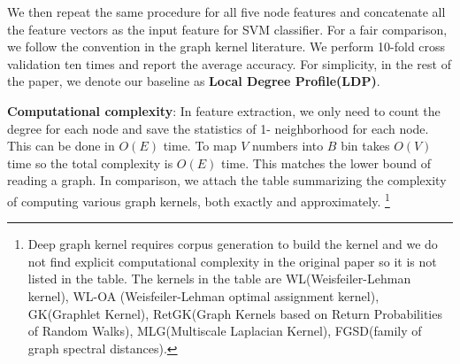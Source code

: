 \documentclass[11pt,onecolumn]{article}
\begin{document}
We then repeat the same procedure for all five node features and concatenate all the feature vectors as the input feature for SVM classifier. For a fair comparison, we follow the convention in the graph kernel literature. We perform 10-fold cross validation ten times and report the average accuracy. For simplicity, in the rest of the paper, we denote our baseline as \textbf{ Local Degree Profile(LDP)}.

\textbf{Computational complexity}:
In feature extraction, we only need to count the degree for each node and save the statistics of 1- neighborhood for each node. This can be done in $O(E)$ time. To map $V$ numbers into $B$ bin takes $O(V)$ time so the total complexity is $O(E)$ time. This matches the lower bound of reading a graph. In comparison, we attach the table summarizing the complexity of computing various graph kernels, both exactly and approximately.
\footnote{Deep graph kernel requires corpus generation to build the kernel and we do not find explicit computational complexity in the original paper so it is not listed in the table. The kernels in the table are WL(Weisfeiler-Lehman kernel)\cite{shervashidze2011weisfeiler}, WL-OA (Weisfeiler-Lehman optimal assignment kernel)\cite{kriege2016valid}, GK(Graphlet Kernel)\cite{shervashidze2009efficient}, RetGK(Graph Kernels based on Return Probabilities
of Random Walks)\cite{zhang2018retgk}, MLG(Multiscale Laplacian Kernel)\cite{kondor2016multiscale}, FGSD(family of graph spectral distances)\cite{verma2017hunt}.} 
\end{document}
